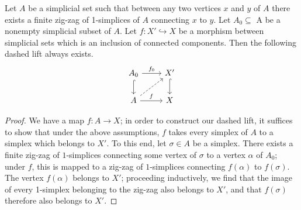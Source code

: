 \documentclass[main.tex]{subfiles}
\begin{document}
\begin{lemma}
  \label{lemma:lifting_wrt_inclusions_of_connected_components}
  Let $A$ be a simplicial set such that between any two vertices $x$ and $y$ of $A$ there exists a finite zig-zag of 1-simplices of $A$ connecting $x$ to $y$. Let $A_{0} \subseteq$ A be a nonempty simplicial subset of $A$. Let $f\colon X' \hookrightarrow X$ be a morphism between simplicial sets which is an inclusion of connected components. Then the following dashed lift always exists.
  \begin{equation*}
    \begin{tikzcd}
      A_{0}
      \arrow[r, "f_{0}"]
      \arrow[d, hook]
      & X'
      \arrow[d, hook]
      \\
      A
      \arrow[r, "f"]
      \arrow[ur, dashed]
      & X
    \end{tikzcd}
  \end{equation*}
\end{lemma}
\begin{proof}
  We have a map $f\colon A \to X$; in order to construct our dashed lift, it suffices to show that under the above assumptions, $f$ takes every simplex of $A$ to a simplex which belongs to $X'$. To this end, let $\sigma \in A$ be a simplex. There exists a finite zig-zag of $1$-simplices connecting some vertex of $\sigma$ to a vertex $\alpha$ of $A_{0}$; under $f$, this is mapped to a zig-zag of $1$-simplices connecting $f(\alpha)$ to $f(\sigma)$. The vertex $f(\alpha)$ belongs to $X'$; proceeding inductively, we find that the image of every 1-simplex belonging to the zig-zag also belongs to $X'$, and that $f(\sigma)$ therefore also belongs to $X'$.
\end{proof}
\end{document}
